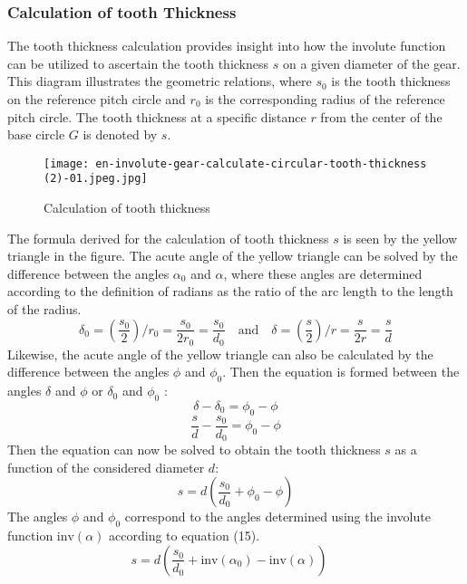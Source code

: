\documentclass{article}
\begin{document}
\subsubsection{Calculation of tooth Thickness}
The tooth thickness calculation provides insight into how the involute function can be utilized to ascertain the tooth thickness \( s \) on a given diameter of the gear. This diagram illustrates the geometric relations, where \( s_0 \) is the tooth thickness on the reference pitch circle and \( r_0 \) is the corresponding radius of the reference pitch circle. The tooth thickness at a specific distance \( r \) from the center of the base circle \( G \) is denoted by \( s \)\cite{Calculation-of-involute-gears-6}.
\begin{figure} [h]
    \centering
    \texttt{[image: en-involute-gear-calculate-circular-tooth-thickness (2)-01.jpeg.jpg]}
    \caption{Calculation of tooth thickness\cite{Calculation-of-involute-gears-6}}
    \label{fig:enter-label}
\end{figure}
The formula derived for the calculation of tooth thickness \( s \) is seen by the yellow triangle in the figure. The acute angle of the yellow triangle can be solved by the difference between the angles \( \alpha_0 \) and \( \alpha \), where these angles are determined according to the definition of radians as the ratio of the arc length to the length of the radius.\cite{Calculation-of-involute-gears-6}
\begin{equation}
    \delta_0 = \left(\frac{s_0}{2}\right) / r_0 = \frac{s_0}{2r_0} = \frac{s_0}{d_0} \quad \text{and} \quad \delta = \left(\frac{s}{2}\right) / r = \frac{s}{2r} = \frac{s}{d}
\end{equation}
Likewise, the acute angle of the yellow triangle can also be calculated by the difference between the angles \( \phi \) and \( \phi_0 \). Then the equation is formed between the angles \( \delta \) and \( \phi \) or \( \delta_0 \) and \( \phi_0 \) \cite{Calculation-of-involute-gears-6}:
\begin{equation}
    \delta - \delta_0 = \phi_0 - \phi
\end{equation}
\begin{equation}
    \frac{s}{d} - \frac{s_0}{d_0} = \phi_0 - \phi
\end{equation}
Then the equation can now be solved to obtain the tooth thickness \( s \) as a function of the considered diameter \( d \):
\begin{equation}
    s = d \left( \frac{s_0}{d_0} + \phi_0 - \phi \right)
\end{equation}
The angles \( \phi \) and \( \phi_0 \) correspond to the angles determined using the involute function \( \text{inv}(\alpha) \) according to equation (15).
\begin{equation}
     s = d \left( \frac{s_0}{d_0} + \text{inv}(\alpha_0) - \text{inv}(\alpha) \right) \quad  
\end{equation}
\end{document}
